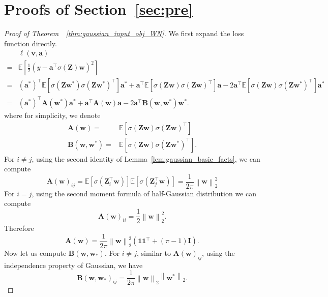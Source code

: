 \documentclass{article}
\newcommand{\firstlayer}{w}
\newcommand{\firstlayerWN}{v}
\newcommand{\secondlayer}{a}
\newcommand{\mat}[1]{\mathbf{#1}}
\newcommand{\vect}[1]{\mathbf{#1}}
\newcommand{\norm}[1]{\left\|#1\right\|}
\newcommand{\expect}{\mathbb{E}}
\newcommand{\relu}[1]{\sigma\left(#1\right)}
\begin{document}
\section{Proofs of Section~\ref{sec:pre}}
\label{sec:proof_formula}
\begin{proof}[Proof of Theorem~~\ref{thm:gaussian_input_obj_WN}]
We first expand the loss function directly.
\begin{align*}
&\ell\left(\vect{\firstlayerWN},\vect{\secondlayer}\right)\\
= &\expect\left[\frac12 \left(y-\vect{\secondlayer}^\top\relu{\mat{Z}}\vect{\firstlayer}\right)^2\right] \\
=&\left(\vect{\secondlayer}^*\right)^\top\expect\left[\relu{\mat{Z}\vect{\firstlayer}^*}\relu{\mat{Z}\vect{\firstlayer}^*}^\top\right]\vect{\secondlayer}^* 
+\vect{\secondlayer}^\top\expect\left[\relu{\mat{Z}\vect{\firstlayer}}\relu{\mat{Z}\vect{\firstlayer}}^\top\right]\vect{\secondlayer} - 2\vect{\secondlayer}^\top \expect\left[\relu{\mat{Z}\vect{\firstlayer}}\relu{\mat{Z}\vect{\firstlayer}^*}^\top\right]\vect{\secondlayer}^* \\
= & \left(\vect{\secondlayer}^*\right)^\top \mat{A}\left(\vect{\firstlayer}^*\right)\vect{\secondlayer}^* + \vect{\secondlayer}^\top\mat{A}\left(\vect{\firstlayer}\right)\vect{\secondlayer} - 2\vect{\secondlayer}^\top\mat{B}\left(\vect{\firstlayer},\vect{\firstlayer}^*\right) \vect{w}^*.
\end{align*}
where for simplicity, we denote \begin{align}\mat{A}(\vect{w}) =& \expect\left[\relu{\mat{Z}\vect{w}}\relu{\mat{Z}\vect{w}}^\top\right] \label{eqn:A}\\
\mat{B}\left(\vect{w},\vect{w}^*\right) = &\expect\left[
\relu{\mat{Z}\vect{w}}\relu{\mat{Z}\vect{w}^*}^\top
\right] \label{eqn:B}.
\end{align}
For $i\neq j$, using the second identity of Lemma~\ref{lem:gaussian_basic_facts}, we can compute \[\mat{A}(\vect{w})_{ij} = \expect\left[\relu{\mat{Z}_i^\top\vect{w}}\right]\expect\left[\relu{\mat{Z}_j^\top\vect{w}}\right] = \frac{1}{2\pi}\norm{\vect{w}}_2^2\] 
For $i=j$,  using the second moment formula of half-Gaussian distribution we can compute \[\mat{A}\left(\vect{w}\right)_{ii} = \frac{1}{2}\norm{\vect{w}}_2^2.\] 
Therefore \[\mat{A}(\vect{w}) = \frac{1}{2\pi}\norm{\vect{w}}_2^2\left(\vect{1}\vect{1}^\top + \left(\pi-1\right)\mat{I}\right).\]
Now let us compute $\mat{B}\left(\vect{w},\vect{w}_*\right)$.
For $i\neq j$, similar to $\mat{A}(\vect{w})_{ij}$, using the independence property of Gaussian, we have \[\mat{B}\left(\vect{w},\vect{w}_*\right)_{ij} = \frac{1}{2\pi}\norm{\vect{w}}_2\norm{\vect{w}^*}_2.\]

\end{proof}
\end{document}
